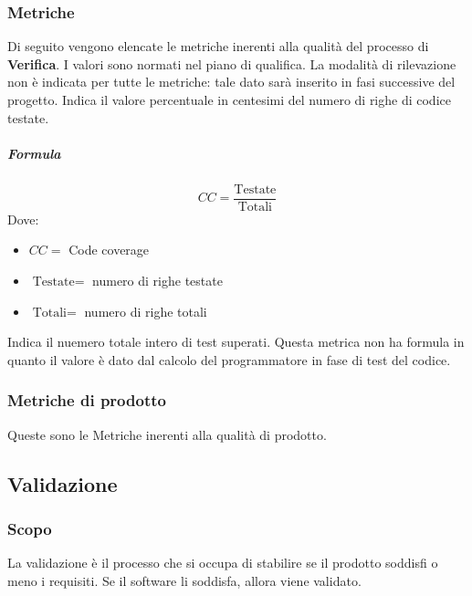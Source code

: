 	\subsubsection{Metriche}
	Di seguito vengono elencate le metriche inerenti alla qualità del processo di \textbf{Verifica}. I valori sono normati nel piano di qualifica. La modalità di rilevazione non è indicata per tutte le metriche: tale dato sarà inserito in fasi successive del progetto.
        Indica il valore percentuale in centesimi del numero di righe di codice testate.
        \subparagraph{Formula}
        \begin{displaymath}
          CC = \frac{\textrm{Testate}}{\textrm{Totali}}
        \end{displaymath}
        Dove:
        \begin{itemize}
        \item[] $CC =$ Code coverage
        \item[] $\textrm{Testate} =$ numero di righe testate
        \item[] $\textrm{Totali} =$ numero di righe totali
        \end{itemize}
        
        
        Indica il nuemero totale intero di test superati. Questa metrica non ha formula in quanto il valore è dato dal calcolo del programmatore in fase di test del codice.
        \subsubsection{Metriche di prodotto}
        Queste sono le Metriche inerenti alla qualità di prodotto.
	
	
	
	\subsection{Validazione}

	\subsubsection{Scopo}
	La validazione è il processo che si occupa di stabilire se il prodotto soddisfi o meno i requisiti. Se il software li soddisfa, allora viene validato.
